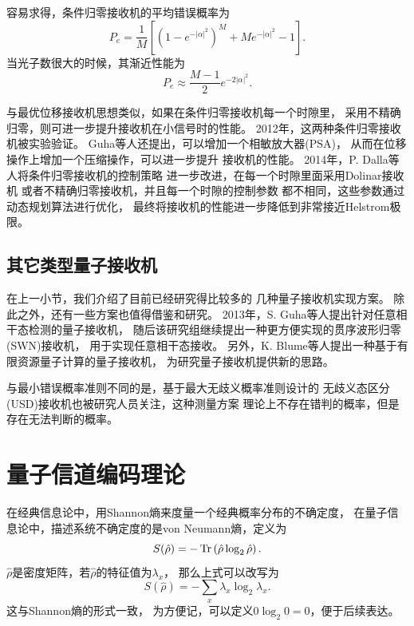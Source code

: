 容易求得，条件归零接收机的平均错误概率为\cite{guha2011approaching,dolinar1982near}
\begin{equation}
P_e = \frac{1}{M}[(1-e^{-|\alpha|^2})^M + M e^{-|\alpha|^2} - 1].
\end{equation}
当光子数很大的时候，其渐近性能为
\begin{equation}
P_e \approx \frac{M-1}{2} e^{-2|\alpha|^2}.
\end{equation}

与最优位移接收机思想类似，如果在条件归零接收机每一个时隙里，
采用不精确归零，则可进一步提升接收机在小信号时的性能\cite{guha2011approaching}。
2012年，这两种条件归零接收机被实验验证\cite{chen2012optical}。
Guha等人还提出，可以增加一个相敏放大器(PSA)，
从而在位移操作上增加一个压缩操作，可以进一步提升
接收机的性能\cite{guha2011approaching}。
2014年，P. Dalla等人将条件归零接收机的控制策略
进一步改进，在每一个时隙里面采用Dolinar接收机
或者不精确归零接收机，并且每一个时隙的控制参数
都不相同，这些参数通过动态规划算法进行优化，
最终将接收机的性能进一步降低到非常接近Helstrom极限\cite{dalla2014adaptive}。



\subsection{其它类型量子接收机}
在上一小节，我们介绍了目前已经研究得比较多的
几种量子接收机实现方案。
除此之外，还有一些方案也值得借鉴和研究。
2013年，S. Guha等人提出针对任意相干态检测的量子接收机\cite{da2013achieving}，
随后该研究组继续提出一种更方便实现的贯序波形归零(SWN)接收机，
用于实现任意相干态接收\cite{nair2014realizable}。
另外，K. Blume等人提出一种基于有限资源量子计算的量子接收机\cite{blume2012ideal}，
为研究量子接收机提供新的思路。

与最小错误概率准则不同的是，基于最大无歧义概率准则设计的
无歧义态区分(USD)接收机也被研究人员关注，这种测量方案
理论上不存在错判的概率，但是存在无法判断的概率\cite{becerra2013implementation}。



\section{量子信道编码理论}

在经典信息论中，用Shannon熵来度量一个经典概率分布的不确定度\cite{jd2001xxlybm}，
在量子信息论中，描述系统不确定度的是von Neumann熵，定义为\cite{nielsen2005qcqi,nielsen2010quantum}
\begin{equation}
S(\hat{\rho}) = -\Tr\left( \hat{\rho} \log_2 \hat{\rho} \right).
\end{equation}
$\hat{\rho}$是密度矩阵，若$\hat{\rho}$的特征值为$\lambda_x$，
那么上式可以改写为
\begin{equation}
S(\hat{\rho}) = -\sum_x \lambda_x \log_2 \lambda_x.
\end{equation}
这与Shannon熵的形式一致，
为方便记，可以定义$0\log_2 0=0$，便于后续表达。

